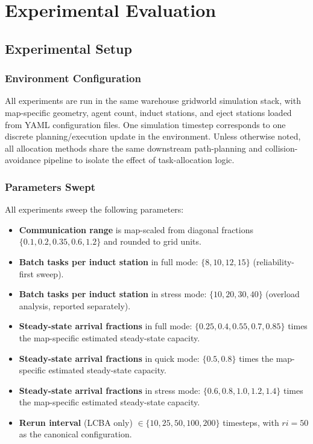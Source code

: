 \chapter{Experimental Evaluation}
\label{chap:experiments}


\section{Experimental Setup}
\label{sec:exp_setup}


\subsection{Environment Configuration}
\label{subsec:exp_environment}

All experiments are run in the same warehouse gridworld simulation stack,
with map-specific geometry, agent count, induct stations, and eject stations
loaded from YAML configuration files. One simulation timestep corresponds to
one discrete planning/execution update in the environment. Unless otherwise
noted, all allocation methods share the same downstream path-planning and
collision-avoidance pipeline to isolate the effect of task-allocation logic.


\subsection{Parameters Swept}
\label{subsec:exp_parameters}

All experiments sweep the following parameters:

\begin{itemize}
  \item \textbf{Communication range} is map-scaled from diagonal fractions
    $\{0.1, 0.2, 0.35, 0.6, 1.2\}$ and rounded to grid units.
  \item \textbf{Batch tasks per induct station} in full mode:
    $\{8, 10, 12, 15\}$ (reliability-first sweep).
  \item \textbf{Batch tasks per induct station} in stress mode:
    $\{10, 20, 30, 40\}$ (overload analysis, reported separately).
  \item \textbf{Steady-state arrival fractions} in full mode:
    $\{0.25, 0.4, 0.55, 0.7, 0.85\}$ times the map-specific
    estimated steady-state capacity.
  \item \textbf{Steady-state arrival fractions} in quick mode:
    $\{0.5, 0.8\}$ times the map-specific estimated steady-state capacity.
  \item \textbf{Steady-state arrival fractions} in stress mode:
    $\{0.6, 0.8, 1.0, 1.2, 1.4\}$ times the map-specific estimated
    steady-state capacity.
  \item \textbf{Rerun interval} (LCBA only)
        $\in \{10, 25, 50, 100, 200\}$ timesteps, with $ri = 50$
        as the canonical configuration.
\end{itemize}

